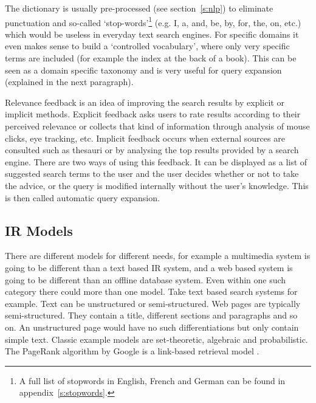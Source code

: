 
The dictionary is usually pre-processed (see section~\ref{s:nlp}) to eliminate punctuation and so-called `stop-words'\footnote{A full list of stopwords in English, French and German can be found in appendix~\ref{s:stopwords}.} (e.g. I, a, and, be, by, for, the, on, etc.) which would be useless in everyday text search engines. For specific domains it even makes sense to build a `controlled vocabulary', where only very specific terms are included (for example the index at the back of a book). This can be seen as a domain specific taxonomy and is very useful for query expansion (explained in the next paragraph).

Relevance feedback is an idea of improving the search results by explicit or implicit methods. Explicit feedback asks users to rate results according to their perceived relevance or collects that kind of information through analysis of mouse clicks, eye tracking, etc. Implicit feedback occurs when external sources are consulted such as thesauri or by analysing the top results provided by a search engine. There are two ways of using this feedback. It can be displayed as a list of suggested search terms to the user and the user decides whether or not to take the advice, or the query is modified internally without the user's knowledge. This is then called automatic query expansion.


\subsection{IR Models}
\label{s:irmodels}

There are different models for different needs, for example a multimedia system is going to be different than a text based \ac{IR} system, and a web based system is going to be different than an offline database system. Even within one such category there could more than one model. Take text based search systems for example. Text can be unstructured or semi-structured. Web pages are typically semi-structured. They contain a title, different sections and paragraphs and so on. An unstructured page would have no such differentiations but only contain simple text.  Classic example models are set-theoretic, algebraic and probabilistic. The PageRank algorithm by Google is a link-based retrieval model \autocite{Brin1998}.

